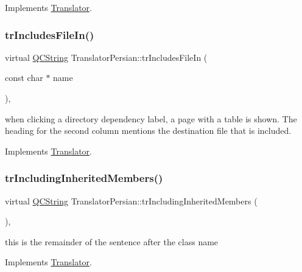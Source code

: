 Implements \mbox{\hyperlink{class_translator}{Translator}}.

\mbox{\label{class_translator_persian_aa38fe54c99986ebfc49fd381111d7ed6}} 
\subsubsection{\texorpdfstring{trIncludesFileIn()}{trIncludesFileIn()}}
{\footnotesize\ttfamily virtual \mbox{\hyperlink{class_q_c_string}{Q\+C\+String}} Translator\+Persian\+::tr\+Includes\+File\+In (\begin{DoxyParamCaption}\item[{const char $\ast$}]{name }\end{DoxyParamCaption})\hspace{0.3cm}{\ttfamily [inline]}, {\ttfamily [virtual]}}

when clicking a directory dependency label, a page with a table is shown. The heading for the second column mentions the destination file that is included. 

Implements \mbox{\hyperlink{class_translator}{Translator}}.

\mbox{\label{class_translator_persian_ab620c33aa490895490622705b3d07e6f}} 
\subsubsection{\texorpdfstring{trIncludingInheritedMembers()}{trIncludingInheritedMembers()}}
{\footnotesize\ttfamily virtual \mbox{\hyperlink{class_q_c_string}{Q\+C\+String}} Translator\+Persian\+::tr\+Including\+Inherited\+Members (\begin{DoxyParamCaption}{ }\end{DoxyParamCaption})\hspace{0.3cm}{\ttfamily [inline]}, {\ttfamily [virtual]}}

this is the remainder of the sentence after the class name 

Implements \mbox{\hyperlink{class_translator}{Translator}}.

